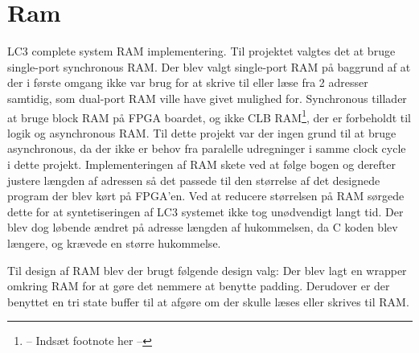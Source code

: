 \section{Ram}
LC3 complete system RAM implementering.
Til projektet valgtes det at bruge single-port synchronous RAM. Der blev valgt single-port RAM på baggrund af at der i første omgang ikke var brug for at skrive til eller læse fra 2 adresser samtidig, som dual-port RAM ville have givet mulighed for. Synchronous tillader at bruge block RAM på FPGA boardet, og ikke CLB RAM\footnote{-- Indsæt footnote her --}, der er forbeholdt til logik og asynchronous RAM. Til dette projekt var der ingen grund til at bruge asynchronous, da der ikke er behov fra paralelle udregninger i samme clock cycle i dette projekt. Implementeringen af RAM skete ved at følge bogen %
og derefter justere længden af adressen så det passede til den størrelse af det designede program der blev kørt på FPGA'en. Ved at reducere størrelsen på RAM sørgede dette for at syntetiseringen af LC3 systemet ikke tog unødvendigt langt tid. Der blev dog løbende ændret på adresse længden af hukommelsen, da C koden blev længere, og krævede en større hukommelse. %

Til design af RAM blev der brugt følgende design valg: Der blev lagt en wrapper omkring RAM for at gøre det nemmere at benytte padding. Derudover er der benyttet en tri state buffer til at afgøre om der skulle læses eller skrives til RAM.
